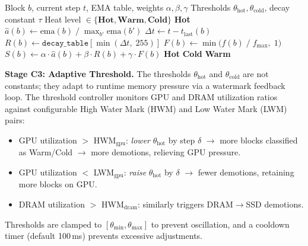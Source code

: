 \documentclass[conference]{IEEEtran}
\begin{document}
\begin{algorithm}[t]
\caption{Per-Block Hot-Cold Classification (C1+C2)}
\label{alg:classify}
\begin{algorithmic}[1]
\Require Block $b$, current step $t$, EMA table, weights $\alpha, \beta, \gamma$
\Require Thresholds $\theta_{\text{hot}}, \theta_{\text{cold}}$, decay constant $\tau$
\Ensure Heat level $\in \{\textbf{Hot}, \textbf{Warm}, \textbf{Cold}\}$
\Statex
{} 
    \State \Return \textbf{Hot}
\EndIf
\Statex
\State $\hat{a}(b) \gets \text{ema}(b) \;/\; \max_{b'} \text{ema}(b')$ 
\State $\Delta t \gets t - t_{\text{last}}(b)$ 
\State $R(b) \gets \texttt{decay\_table}[\min(\Delta t,\; 255)]$ 
\State $F(b) \gets \min\bigl(f(b) \;/\; f_{\max},\; 1\bigr)$ 
\Statex
\State $S(b) \gets \alpha \cdot \hat{a}(b) + \beta \cdot R(b) + \gamma \cdot F(b)$ 
\Statex
{}
    \State \Return \textbf{Hot} 
    \State \Return \textbf{Cold} 
\Else
    \State \Return \textbf{Warm} 
\EndIf
\end{algorithmic}
\end{algorithm}

\textbf{Stage C3: Adaptive Threshold.} The thresholds $\theta_{\text{hot}}$ and $\theta_{\text{cold}}$ are not constants; they adapt to runtime memory pressure via a watermark feedback loop. The threshold controller monitors GPU and DRAM utilization ratios against configurable High Water Mark (HWM) and Low Water Mark (LWM) pairs:

\begin{itemize}
\item GPU utilization $>$ HWM$_{\text{gpu}}$: \emph{lower} $\theta_{\text{hot}}$ by step $\delta$ $\to$ more blocks classified as Warm/Cold $\to$ more demotions, relieving GPU pressure.
\item GPU utilization $<$ LWM$_{\text{gpu}}$: \emph{raise} $\theta_{\text{hot}}$ by $\delta$ $\to$ fewer demotions, retaining more blocks on GPU.
\item DRAM utilization $>$ HWM$_{\text{dram}}$: similarly triggers DRAM$\to$SSD demotions.
\end{itemize}

Thresholds are clamped to $[\theta_{\min}, \theta_{\max}]$ to prevent oscillation, and a cooldown timer (default 100\,ms) prevents excessive adjustments.
\end{document}
